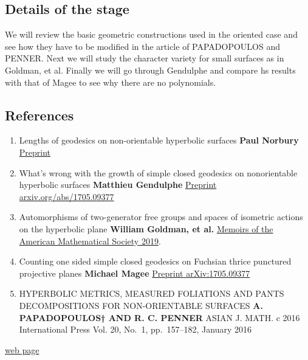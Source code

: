 \documentclass[
]{article}
\providecommand{\tightlist}{%
  \setlength{\itemsep}{0pt}\setlength{\parskip}{0pt}}
\begin{document}
\hypertarget{details-of-the-stage}{%
\subsection{Details of the stage}\label{details-of-the-stage}}

We will review the basic geometric constructions used in the oriented
case and see how they have to be modified in the article of PAPADOPOULOS
and PENNER. Next we will study the character variety for small surfaces
as in Goldman, et al. Finally we will go through Gendulphe and compare
hs results with that of Magee to see why there are no polynomials.

\hypertarget{references}{%
\subsection{References}\label{references}}

\begin{enumerate}
\def\labelenumi{\arabic{enumi}.}
\tightlist
\item
  Lengths of geodesics on non-orientable hyperbolic surfaces
  \textbf{Paul Norbury}
  \href{https://arxiv.org/abs/math/0612128}{Preprint}
\item
  What's wrong with the growth of simple closed geodesics on
  nonorientable hyperbolic surfaces \textbf{Matthieu Gendulphe}
  \href{https://arxiv.org/abs/1705.09377}{Preprint
  arxiv.org/abs/1705.09377}
\item
  Automorphisms of two-generator free groups and spaces of isometric
  actions on the hyperbolic plane \textbf{William Goldman, et al.}
  \href{https://arxiv.org/abs/1509.03790}{Memoirs of the American
  Mathematical Society 2019}.
\item
  Counting one sided simple closed geodesics on Fuchsian thrice
  punctured projective planes \textbf{Michael Magee}
  \href{https://arxiv.org/abs/1705.09377}{Preprint arXiv:1705.09377}
\item
  HYPERBOLIC METRICS, MEASURED FOLIATIONS AND PANTS DECOMPOSITIONS FOR
  NON-ORIENTABLE SURFACES \textbf{A. PAPADOPOULOS† AND R. C. PENNER}
  ASIAN J. MATH. c 2016 International Press Vol. 20, No.~1,
  pp.~157--182, January 2016
\end{enumerate}

\href{https://github.com/macbuse/MATH/edit/master/stage\%20m2r\%202019.md}{web
page}
\end{document}
